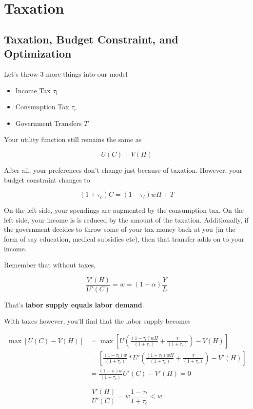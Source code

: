 \documentclass[11pt]{scrartcl}
\begin{document}
\section{Taxation}

\subsection{Taxation, Budget Constraint, and Optimization}

Let's throw 3 more things into our model

\begin{itemize}
	\item Income Tax $\tau_l$
	\item Consumption Tax $\tau_c$
	\item Government Transfers $T$
\end{itemize}

Your utility function still remains the same as 

\[ U(C) - V(H) \]

After all, your preferences don't change just because of taxation. However, your budget constraint changes to

\[(1+\tau_c)C = (1-\tau_l)wH + T\]

On the left side, your spendings are augmented by the consumption tax. On the left side, your income is is reduced by the amount of the taxation. Additionally, if the government decides to throw some of your tax money back at you (in the form of say education, medical subsidies etc), then that transfer adds on to your income.

Remember that without taxes, 

\[\frac{V'(H)}{U'(C)} = w = (1-\alpha)\frac{Y}{L}\]

That's \textbf{labor supply equals labor demand}.

With taxes however, you'll find that the labor supply becomes

\begin{align*}
\max [U(C) - V(H)] &= \max \left[U\left(\frac{(1-\tau_l)wH}{(1+\tau_c)} + \frac{T}{(1+\tau_c)} \right) - V(H)\right] \\
&= \left[\frac{(1-\tau_l)w}{(1+\tau_c)} * U'\left(\frac{(1-\tau_l)wH}{(1+\tau_c)} + \frac{T}{(1+\tau_c)} \right) - V'(H) \right] \\
&= \frac{(1-\tau_l)w}{(1+\tau_c)}U'(C) - V'(H) = 0
\end{align*}

\[\frac{V'(H)}{U'(C)} = w \frac{1-\tau_l}{1+\tau_c} < w\]
\end{document}
